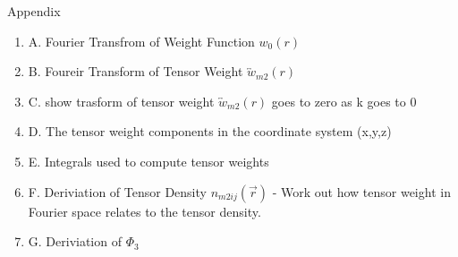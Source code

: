 \documentclass[letterpaper,twocolumn,amsmath,amssymb,prb]{revtex4-1}
\begin{document}
\begin{widetext}
\[{}\]


Appendix
\begin{enumerate}
\item A. Fourier Transfrom of Weight Function $w_0(r)$  
\item B. Foureir Transform of Tensor Weight $\overleftrightarrow{w}_{m2}(r)$
\item C. show trasform of tensor weight $\overleftrightarrow{w}_{m2}(r)$ goes to zero as k goes to 0
\item D. The tensor weight components in the coordinate system (x,y,z) 
\item E. Integrals used to compute tensor weights
\item F. Deriviation of Tensor Density $n_{m2ij}(\vec{r})$ - Work out how tensor weight in Fourier space relates to the tensor density.
\item G. Deriviation of $\Phi_3$ 
\end{enumerate}


\[{}\]

\end{widetext}
\end{document}
